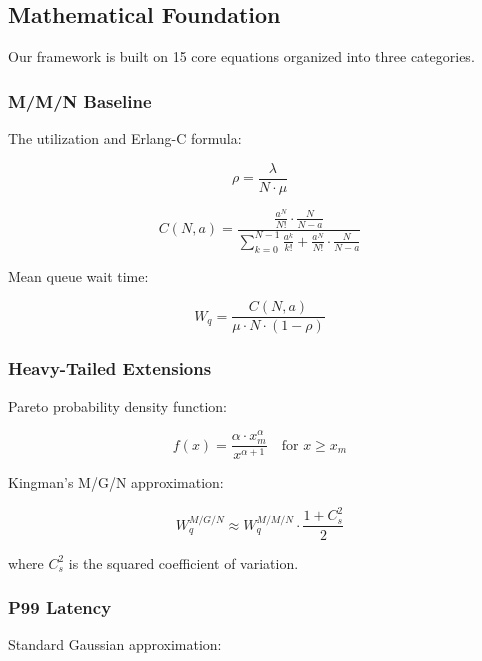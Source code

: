 \documentclass[conference,twocolumn]{IEEEtran}
\begin{document}
\subsection{Mathematical Foundation}

Our framework is built on 15 core equations organized into three categories.

\subsubsection{M/M/N Baseline}

The utilization and Erlang-C formula:

\begin{equation}
\rho = \frac{\lambda}{N \cdot \mu}
\end{equation}

\begin{equation}
C(N, a) = \frac{\frac{a^N}{N!} \cdot \frac{N}{N-a}}{\sum_{k=0}^{N-1}\frac{a^k}{k!} + \frac{a^N}{N!} \cdot \frac{N}{N-a}}
\end{equation}

Mean queue wait time:

\begin{equation}
W_q = \frac{C(N, a)}{\mu \cdot N \cdot (1-\rho)}
\end{equation}

\subsubsection{Heavy-Tailed Extensions}

Pareto probability density function:

\begin{equation}
f(x) = \frac{\alpha \cdot x_m^\alpha}{x^{\alpha+1}} \quad \text{for } x \geq x_m
\end{equation}

Kingman's M/G/N approximation:

\begin{equation}
W_q^{M/G/N} \approx W_q^{M/M/N} \cdot \frac{1 + C_s^2}{2}
\end{equation}

where $C_s^2$ is the squared coefficient of variation.

\subsubsection{P99 Latency}

Standard Gaussian approximation:
\end{document}

